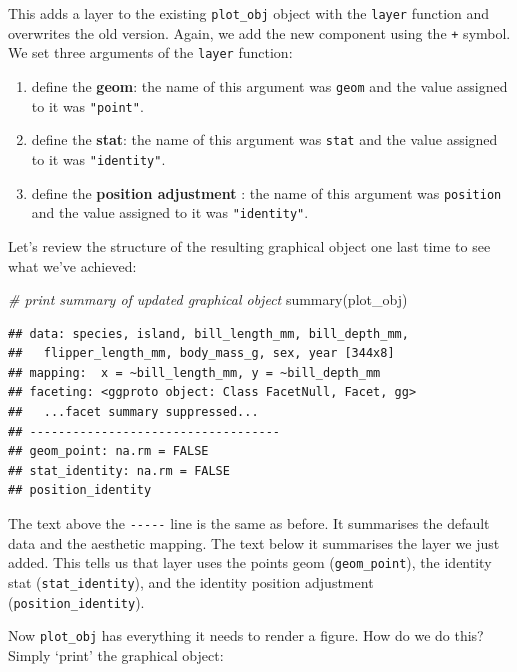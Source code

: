 \documentclass[
]{book}
\newenvironment{Shaded}{\begin{snugshade}}{\end{snugshade}}
\newcommand{\CommentTok}[1]{\textcolor[rgb]{0.56,0.35,0.01}{\textit{#1}}}
\newcommand{\FunctionTok}[1]{\textcolor[rgb]{0.00,0.00,0.00}{#1}}
\newcommand{\NormalTok}[1]{#1}
\providecommand{\tightlist}{%
  \setlength{\itemsep}{0pt}\setlength{\parskip}{0pt}}
\begin{document}
This adds a layer to the existing \texttt{plot\_obj} object with the \texttt{layer} function and overwrites the old version. Again, we add the new component using the \texttt{+} symbol. We set three arguments of the \texttt{layer} function:

\begin{enumerate}
\def\labelenumi{\arabic{enumi}.}
\tightlist
\item
  define the \textbf{geom}: the name of this argument was \texttt{geom} and the value assigned to it was \texttt{"point"}.
\item
  define the \textbf{stat}: the name of this argument was \texttt{stat} and the value assigned to it was \texttt{"identity"}.
\item
  define the \textbf{position adjustment} : the name of this argument was \texttt{position} and the value assigned to it was \texttt{"identity"}.
\end{enumerate}

Let's review the structure of the resulting graphical object one last time to see what we've achieved:

\begin{Shaded}
\begin{Highlighting}[]
\CommentTok{\# print summary of updated graphical object}
\FunctionTok{summary}\NormalTok{(plot\_obj)}
\end{Highlighting}
\end{Shaded}

\begin{verbatim}
## data: species, island, bill_length_mm, bill_depth_mm,
##   flipper_length_mm, body_mass_g, sex, year [344x8]
## mapping:  x = ~bill_length_mm, y = ~bill_depth_mm
## faceting: <ggproto object: Class FacetNull, Facet, gg>
##   ...facet summary suppressed...
## -----------------------------------
## geom_point: na.rm = FALSE
## stat_identity: na.rm = FALSE
## position_identity
\end{verbatim}

The text above the \texttt{-\/-\/-\/-\/-} line is the same as before. It summarises the default data and the aesthetic mapping. The text below it summarises the layer we just added. This tells us that layer uses the points geom (\texttt{geom\_point}), the identity stat (\texttt{stat\_identity}), and the identity position adjustment (\texttt{position\_identity}).

Now \texttt{plot\_obj} has everything it needs to render a figure. How do we do this? Simply `print' the graphical object:
\end{document}
